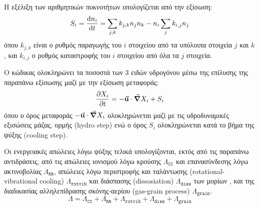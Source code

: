 	Η εξέλιξη των αριθμητικών πυκνοτήτων υπολογίζεται από την εξίσωση:
	\begin{equation}
	S_i=\dv{n_i}{t}=\sum\limits_{j,k}k_{j,k}n_j n_k - n_i \sum_{j}k_{i,j}n_j
	\end{equation}
	όπου $k_{j,k}$ είναι ο ρυθμός παραγωγής του $i$ στοιχείου από τα υπόλοιπα στοιχεία $j$ και $k$, και $k_{i,j}$ ο ρυθμός καταστροφής του $i$ στοιχείου από όλα τα $j$ στοιχεία.
	
	Ο κώδικας ολοκληρώνει τα ποσοστά των 3 ειδών υδρογόνου μέσω της επίλυσης της παραπάνω εξίσωσης μαζί με την εξίσωση μεταφοράς:
	\begin{equation}
	\pdv{X_i}{t}=-\va{u}\cdot \grad{X_i}+S_i
	\end{equation}
	όπου ο όρος μεταφοράς $-\va{u}\cdot \grad{X_i}$ ολοκληρώνεται μαζί με τις υδροδυναμικές εξισώσεις μάζας, ορμής (hydro step) ενώ ο όρος $S_i$ ολοκληρώνεται κατά το βήμα της ψύξης (cooling step).
	
	Οι ενεργειακές απώλειες λόγω ψύξης τελικά υπολογίζονται, εκτός από τις παραπάνω αντιδράσεις, από τις απώλειες ιονισμού λόγω κρούσης $\Lambda _{\mathtt{CI}}$ και επανασύνδεσης λόγω ακτινοβολίας $\Lambda _{\mathtt{RR}}$, απώλειες λόγω περιστροφής και ταλάντωσης (rotational-vibrational cooling) $\Lambda _{\mathtt{rotvib}}$ και διάσπασης (dissosiation) $\Lambda _{\mathtt{diss}}$ των μορίων , και της διαδικασίας αλληλεπίδρασης σκόνης-αερίου (gas-grain process) $\Lambda _{\mathtt{grain}}$.
	\begin{equation}
	\Lambda = \Lambda _{\mathtt{CI}} + \Lambda _{\mathtt{RR}} +\Lambda _{\mathtt{rotvib}} + \Lambda _{\mathtt{diss}} + \Lambda _{\mathtt{grain}}
	\end{equation}
	
%

